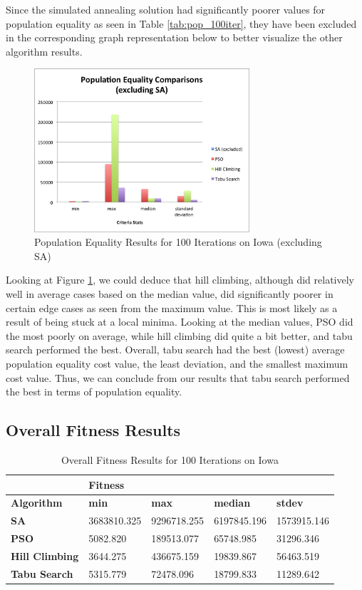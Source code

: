 \documentclass[journal]{IEEEtran}
\begin{document}
Since the simulated annealing solution had significantly poorer values for population equality as seen in Table \ref{tab:pop_100iter}, they have been excluded in the corresponding graph representation below to better visualize the other algorithm results.

\begin{figure}[h!]
    \includegraphics[width=8cm]{images/pop_equality_graph.png}
    \centering
    \caption{Population Equality Results for 100 Iterations on Iowa (excluding SA)}
    \label{fig:pop_results}
\end{figure}

Looking at Figure \ref{fig:pop_results}, we could deduce that hill climbing, although did relatively well in average cases based on the median value, did significantly poorer in certain edge cases as seen from the maximum value. This is most likely as a result of being stuck at a local minima. Looking at the median values, PSO did the most poorly on average, while hill climbing did quite a bit better, and tabu search performed the best. Overall, tabu search had the best (lowest) average population equality cost value, the least deviation, and the smallest maximum cost value. Thus, we can conclude from our results that tabu search performed the best in terms of population equality.

\subsection{Overall Fitness Results}

\begin{table}[!h]
\centering
\caption{Overall Fitness Results for 100 Iterations on Iowa}
\label{tab:fitness_100iter}
\begin{tabular}{l|llll}
                       & \multicolumn{4}{l}{\textbf{Fitness}}                          \\ \hline
\textbf{Algorithm}     & \textbf{min} & \textbf{max} & \textbf{median} & \textbf{stdev} \\ \hline
\textbf{SA}            & 3683810.325  & 9296718.255  & 6197845.196     & 1573915.146    \\
\textbf{PSO}           & 5082.820     & 189513.077   & 65748.985       & 31296.346      \\
\textbf{Hill Climbing} & 3644.275     & 436675.159   & 19839.867       & 56463.519      \\
\textbf{Tabu Search}   & 5315.779     & 72478.096    & 18799.833       & 11289.642     
\end{tabular}
\end{table}
\end{document}
